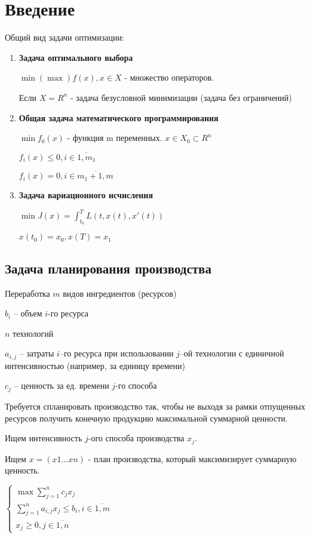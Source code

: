 \documentclass[11pt]{article}
\begin{document}
\raggedright
\begin{sloppypar}
  \section*{Введение}
  Общий вид задачи оптимизации:
  \begin{enumerate}
    \item \textbf{Задача оптимального выбора}
    
      $\min (\max) f(x), x \in X$ - множество операторов.

      Если $X = R^n$ - задача безусловной минимизации (задача без ограничений)
    \item \textbf{Общая задача математического программирования}

      $\min f_0(x)$ - функция m переменных. $x \in X_0 \subset R^n$
      
      $f_i(x) \leq 0, i \in \overline{1, m_1}$
      
      $f_i(x) = 0, i \in \overline{m_1 + 1, m}$
    \item \textbf{Задача вариационного исчисления}
    
      $\min J(x) = \int_{t_0}^T L(t, x(t), x'(t))$
      
      $x(t_0) = x_0, x(T) = x_1$
  \end{enumerate}
  \subsection*{Задача планирования производства}
  Переработка $m$ видов ингредиентов (ресурсов)

  $b_i$ – объем $i$-го ресурса
  
  $n$ технологий
  
  $a_{i, j}$ – затраты $i$–го ресурса при использовании $j$–ой технологии с единичной интенсивностью (например, за единицу времени)
  
  $c_j$ – ценность за ед. времени $j$-го способа

  Требуется спланировать производство так, чтобы не выходя за рамки отпущенных ресурсов получить конечную продукцию максимальной суммарной ценности.
  
  Ищем интенсивность $j$-ого способа производства $x_j$.
  
  Ищем $x = (x1 \dots xn)$ - план производства, который максимизирует суммарную ценность.
  
  $\begin{cases}
    \max \sum_{j = 1}^n c_j x_j \\
    \sum_{j = 1}^n a_{i, j} x_j \leq b_i, i \in \overline{1, m} \\
    x_j \geq 0, j \in \overline{1, n}
  \end{cases}$
  

\end{sloppypar}
\end{document}
